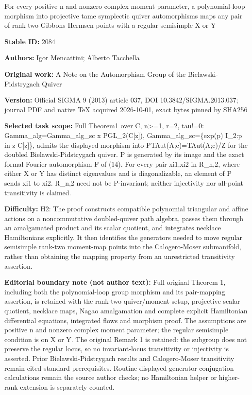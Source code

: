 \documentclass[11pt]{article}
\begin{document}
\begin{center}\Large For every positive n and nonzero complex moment parameter, a polynomial-loop morphism into projective tame symplectic quiver automorphisms maps any pair of rank-two Gibbons-Hermsen points with a regular semisimple X or Y\end{center}
\noindent\textbf{Stable ID:} 2084\par
\noindent\textbf{Authors:} Igor Mencattini; Alberto Tacchella\par
\noindent\textbf{Original work:} A Note on the Automorphism Group of the Bielawski-Pidstrygach Quiver\par
\noindent\textbf{Version:} Official SIGMA 9 (2013) article 037, DOI 10.3842/SIGMA.2013.037; journal PDF and native TeX acquired 2026-10-01, exact bytes pinned by SHA256\par
\noindent\textbf{Selected task scope:} Full Theorem1 over C, n>=\allowbreak{}1, r=\allowbreak{}2, tau!=\allowbreak{}0: Gamma\_alg=\allowbreak{}Gamma\_alg\_sc x PGL\_2(C[z]), Gamma\_alg\_sc=\allowbreak{}\{exp(p) I\_2:p in z C[z]\}, admits the displayed morphism into PTAut(A;c)=\allowbreak{}TAut(A;c)/Z for the doubled Bielawski-Pidstrygach quiver. P is generated by its image and the exact formal Fourier automorphism F of (14). For every pair xi1,xi2 in R\_n,2, where either X or Y has distinct eigenvalues and is diagonalizable, an element of P sends xi1 to xi2. R\_n,2 need not be P-invariant; neither injectivity nor all-point transitivity is claimed.\par
\noindent\textbf{Difficulty:} H2: The proof constructs compatible polynomial triangular and affine actions on a noncommutative doubled-quiver path algebra, passes them through an amalgamated product and its scalar quotient, and integrates necklace Hamiltonians explicitly. It then identifies the generators needed to move regular semisimple rank-two moment-map points into the Calogero-Moser submanifold, rather than obtaining the mapping property from an unrestricted transitivity assertion.\par
\noindent\textbf{Editorial boundary note (not author text):} Full original Theorem 1, including both the polynomial-loop group morphism and its pair-mapping assertion, is retained with the rank-two quiver/moment setup, projective scalar quotient, necklace maps, Nagao amalgamation and complete explicit Hamiltonian differential equations, integrated flows and morphism proof. The assumptions are positive n and nonzero complex moment parameter; the regular semisimple condition is on X or Y. The original Remark 1 is retained: the subgroup does not preserve the regular locus, so no invariant-locus transitivity or injectivity is asserted. Prior Bielawski-Pidstrygach results and Calogero-Moser transitivity remain cited standard prerequisites. Routine displayed-generator conjugation calculations remain the source author checks; no Hamiltonian helper or higher-rank extension is separately counted.\par
\end{document}
